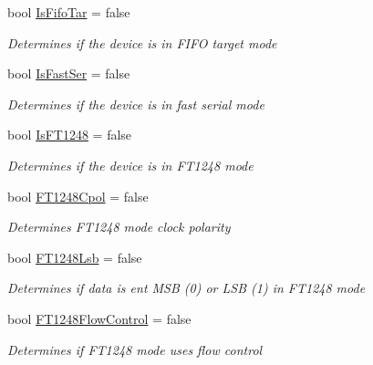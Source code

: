 \begin{DoxyCompactItemize}
bool \mbox{\hyperlink{class_f_t_d2_x_x___n_e_t_1_1_f_t_d_i_1_1_f_t232_h___e_e_p_r_o_m___s_t_r_u_c_t_u_r_e_a45c7d7bc6a29db11d81a579f110769c2}{Is\+Fifo\+Tar}} = false
\begin{DoxyCompactList}\small\item\em Determines if the device is in F\+I\+FO target mode \end{DoxyCompactList}\item 
bool \mbox{\hyperlink{class_f_t_d2_x_x___n_e_t_1_1_f_t_d_i_1_1_f_t232_h___e_e_p_r_o_m___s_t_r_u_c_t_u_r_e_adeb77245615fd6ad1c698f3d94f29329}{Is\+Fast\+Ser}} = false
\begin{DoxyCompactList}\small\item\em Determines if the device is in fast serial mode \end{DoxyCompactList}\item 
bool \mbox{\hyperlink{class_f_t_d2_x_x___n_e_t_1_1_f_t_d_i_1_1_f_t232_h___e_e_p_r_o_m___s_t_r_u_c_t_u_r_e_a3de41e32c6135f9c3fd94e368bbb3ae1}{Is\+F\+T1248}} = false
\begin{DoxyCompactList}\small\item\em Determines if the device is in F\+T1248 mode \end{DoxyCompactList}\item 
bool \mbox{\hyperlink{class_f_t_d2_x_x___n_e_t_1_1_f_t_d_i_1_1_f_t232_h___e_e_p_r_o_m___s_t_r_u_c_t_u_r_e_acfdcb92a5354d0d01133732787b8370e}{F\+T1248\+Cpol}} = false
\begin{DoxyCompactList}\small\item\em Determines F\+T1248 mode clock polarity \end{DoxyCompactList}\item 
bool \mbox{\hyperlink{class_f_t_d2_x_x___n_e_t_1_1_f_t_d_i_1_1_f_t232_h___e_e_p_r_o_m___s_t_r_u_c_t_u_r_e_abecc2f2859cbd412880e973f9925c5ab}{F\+T1248\+Lsb}} = false
\begin{DoxyCompactList}\small\item\em Determines if data is ent M\+SB (0) or L\+SB (1) in F\+T1248 mode \end{DoxyCompactList}\item 
bool \mbox{\hyperlink{class_f_t_d2_x_x___n_e_t_1_1_f_t_d_i_1_1_f_t232_h___e_e_p_r_o_m___s_t_r_u_c_t_u_r_e_a089e54fa646a17ea6052a34d43b4b13f}{F\+T1248\+Flow\+Control}} = false
\begin{DoxyCompactList}\small\item\em Determines if F\+T1248 mode uses flow control \end{DoxyCompactList}\item 

\end{DoxyCompactItemize}
